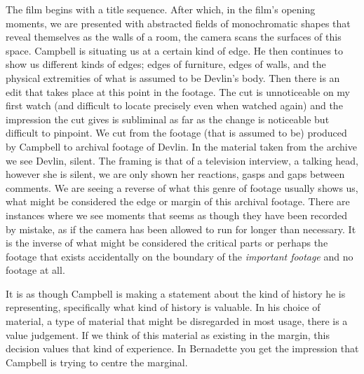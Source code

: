 \documentclass[12pt]{article}
\begin{document}
The film begins with a title sequence. After which, in the film's opening moments, we are presented with abstracted fields of monochromatic shapes that reveal themselves as the walls of a room, the camera scans the surfaces of this space. Campbell is situating us at a certain kind of edge. He then continues to show us different kinds of edges; edges of furniture, edges of walls, and the physical extremities of what is assumed to be Devlin's body. Then there is an edit that takes place at this point in the footage. The cut is unnoticeable on my first watch (and difficult to locate precisely even when watched again) and the impression the cut gives is subliminal as far as the change is noticeable but difficult to pinpoint. We cut from the footage (that is assumed to be) produced by Campbell to archival footage of Devlin. In the material taken from the archive we see Devlin, silent. The framing is that of a television interview, a talking head, however she is silent, we are only shown her reactions, gasps and gaps between comments. We are seeing a reverse of what this genre of footage usually shows us, what might be considered the edge or margin of this archival footage. There are instances where we see moments that seems as though they have been recorded by mistake, as if the camera has been allowed to run for longer than necessary. It is the inverse of what might be considered the critical parts or perhaps the footage that exists accidentally on the boundary of the \textit{important footage} and no footage at all. 

It is as though Campbell is making a statement about the kind of history he is representing, specifically what kind of history is valuable. In his choice of material, a type of material that might be disregarded in most usage, there is a value judgement. If we think of this material as existing in the margin, this decision values that kind of experience. In Bernadette you get the impression that Campbell is trying to centre the marginal.  
\end{document}
